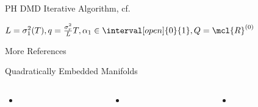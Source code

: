 {    \begin{frame}{PH DMD Iterative Algorithm, cf.~\cite[Algorithm~1]{Morandin2022}}
        \begin{center}
            \begin{minipage}{.55\linewidth}
                \begin{algorithm}[H]
                    $L = \sigma_1^2(T), q = \frac{\sigma_r^2}{L} T, \alpha_1 \in \interval[open]{0}{1}, Q = \mcl{R}^{(0)}$\;
                \end{algorithm}
            \end{minipage}
        \end{center}
    \end{frame}

    \begin{frame}{More References}
        \begin{block}{Quadratically Embedded Manifolds}
            \begin{columns}[totalwidth=\linewidth]
                \begin{column}{.3\textwidth}
                    \begin{itemize}
                        \item \cite{Rutzmoser2017}
                    \end{itemize}
                \end{column}
                \begin{column}{.3\textwidth}
                    \begin{itemize}
                        \item \cite{Benner2022}
                    \end{itemize}
                \end{column}
                \begin{column}{.3\textwidth}
                    \begin{itemize}
                        \item \cite{Barnett2022}
                    \end{itemize}
                \end{column}
            \end{columns}
        \end{block}


\end{frame}}
